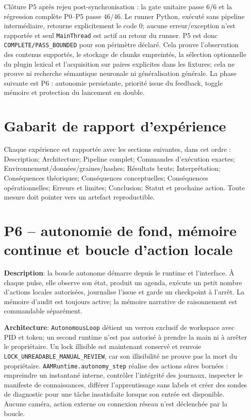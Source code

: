\documentclass[11pt,a4paper,oneside]{report}
\begin{document}
Clôture P5 après rejeu post-synchronisation : la gate unitaire passe 6/6 et la régression complète P0–P5 passe 46/46. Le runner Python, exécuté sans pipeline intermédiaire, retourne explicitement le code 0; aucune erreur/exception n’est rapportée et seul \texttt{MainThread} est actif au retour du runner. P5 est donc \texttt{COMPLETE/PASS\_BOUNDED} pour son périmètre déclaré. Cela prouve l’observation des contenus supportés, le stockage de chunks empreintés, la sélection optionnelle du plugin lexical et l’acquisition sur paires explicites dans les fixtures; cela ne prouve ni recherche sémantique neuronale ni généralisation générale. La phase suivante est P6 : autonomie persistante, priorité issue du feedback, toggle mémoire et protection du lancement en double.

\appendix
\chapter{Gabarit de rapport d'expérience}
Chaque expérience est rapportée avec les sections suivantes, dans cet ordre : Description; Architecture; Pipeline complet; Commandes d'exécution exactes; Environnement/données/graines/hashes; Résultats bruts; Interprétation; Conséquences théoriques; Conséquences conceptuelles; Conséquences opérationnelles; Erreurs et limites; Conclusion; Statut et prochaine action. Toute mesure doit pointer vers un artefact reproductible.

\chapter{P6 -- autonomie de fond, mémoire continue et boucle d’action locale}
\textbf{Description}: la boucle autonome démarre depuis le runtime et l’interface. À chaque pulse, elle observe son état, produit un agenda, exécute un petit nombre d’actions locales autorisées, journalise l’issue et garde un checkpoint à l’arrêt. La mémoire d’audit est toujours active; la mémoire narrative de raisonnement est commandable séparément.

\textbf{Architecture}: \texttt{AutonomousLoop} détient un verrou exclusif de workspace avec PID et token; un second runtime n’est pas autorisé à prendre la main ni à arrêter le propriétaire. Un lock illisible est maintenant conservé et renvoie \texttt{LOCK\_UNREADABLE\_MANUAL\_REVIEW}, car son illisibilité ne prouve pas la mort du propriétaire. \texttt{AAMRuntime.autonomy\_step} réalise des actions sûres bornées : empreindre un instantané interne, contrôler l’intégrité des journaux, inspecter le manifeste de connaissances, différer l’apprentissage sans labels et créer des sondes de diagnostic pour une tâche insatisfaite lorsque son entrée est disponible. Aucune caméra, action externe ou connexion réseau n’est déclenchée par la boucle.
\end{document}
